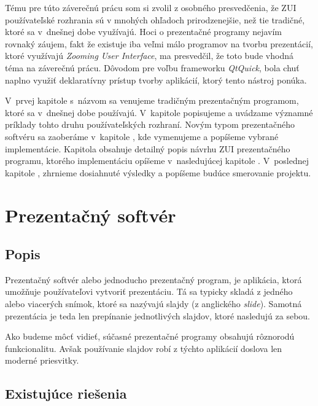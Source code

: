 Tému pre túto záverečnú prácu som si zvolil z osobného presvedčenia, že ZUI používateľské rozhrania sú v mnohých ohľadoch prirodzenejšie, než tie tradičné, ktoré sa v~dnešnej dobe využívajú. Hoci o prezentačné programy nejavím rovnaký záujem, fakt že existuje iba veľmi málo programov na tvorbu prezentácií, ktoré využívajú \textit{Zooming User Interface}, ma presvedčil, že toto bude vhodná téma na záverečnú prácu. Dôvodom pre voľbu frameworku \textit{QtQuick}, bola chuť naplno využiť deklaratívny prístup tvorby aplikácií, ktorý tento nástroj ponúka.

V~prvej kapitole s~názvom  sa venujeme tradičným prezentačným programom, ktoré sa v~dnešnej dobe používajú. V~kapitole  popisujeme a uvádzame významné príklady tohto druhu používateľských rozhraní. Novým typom prezentačného softvéru sa zaoberáme v~kapitole , kde vymenujeme a popíšeme vybrané implementácie. Kapitola  obsahuje detailný popis návrhu ZUI prezentačného programu, ktorého implementáciu opíšeme v~nasledujúcej kapitole . V~poslednej kapitole , zhrnieme dosiahnuté výsledky a popíšeme budúce smerovanie projektu.

\chapter{Prezentačný softvér} \label{ch:prezentacny_softver}
\section{Popis} \label{sec:presentation_desc}

Prezentačný softvér alebo jednoducho prezentačný program, je aplikácia, ktorá umožňuje používateľovi vytvoriť prezentáciu. Tá sa typicky skladá z jedného alebo viacerých snímok, ktoré sa nazývajú slajdy (z anglického \textit{slide}). Samotná prezentácia je teda len prepínanie jednotlivých slajdov, ktoré nasledujú za sebou.

Ako budeme môcť vidieť, súčasné prezentačné programy obsahujú rôznorodú funkcionalitu. Avšak používanie slajdov robí z týchto aplikácií doslova len moderné priesvitky.

\section{Existujúce riešenia}

